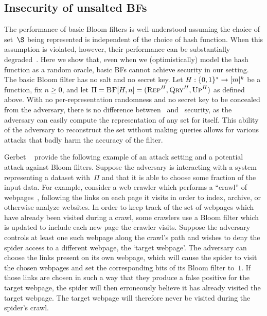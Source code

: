 \subsection{Insecurity of unsalted BFs}\label{sec:bad-bfs}
The performance of basic Bloom filters is well-understood assuming the choice of
set~$\S$ being represented is independent of the choice of hash function. When
this assumption is violated, however, their performance can be substantially
degraded~\cite{gerbet2015power}.
%
Here we show that, even when we (optimistically) model the hash function as a
random oracle, basic BFs cannot achieve security in our setting.
%
The basic Bloom filter has no salt and no secret key.
Let $H:\{0,1\}^*\to[m]^k$ be a function, fix $n\geq0$, and let
$\Pi = \textnormal{\textsc{BF}}[H,n]=(\textnormal{\textsc{Rep}}^H,\textnormal{\textsc{Qry}}^H,\textnormal{\textsc{Up}}^H)$ as defined above.
%
With no per-representation randomness and no secret key to be concealed from the
adversary, there is no difference between \errep\ and \erreps\ security, as the
adversary can easily compute the representation of any set for itself. This
ability of the adversary to reconstruct the set without making queries allows
for various attacks that badly harm the accuracy of the filter.

Gerbet \etal~\cite{gerbet2015power} provide the following example of an attack
setting and a potential attack against Bloom filters.
Suppose the adversary is interacting with a system representing a dataset
with~$\Pi$ and that it is able to choose some fraction of the input data.  For
example, consider a web crawler which performs a ``crawl'' of webpages~\cite{mapreduce}, following
the links on each page it visits in order to index, archive, or otherwise
analyze websites. In order to keep track of the set of webpages which have
already been visited during a crawl, some crawlers use a Bloom filter which is
updated to include each new page the crawler visits.
Suppose the adversary controls at least one such webpage along the crawl's path
and wishes to deny the spider access to a different webpage, the `target
webpage'. The adversary can choose the links present on its own webpage, which
will cause the spider to visit the chosen webpages and set the corresponding
bits of its Bloom filter to~$1$. If those links are chosen in such a way that they
produce a false positive for the target webpage, the spider will then
erroneously believe it has already visited the target webpage. The target
webpage will therefore never be visited during the spider's crawl.

